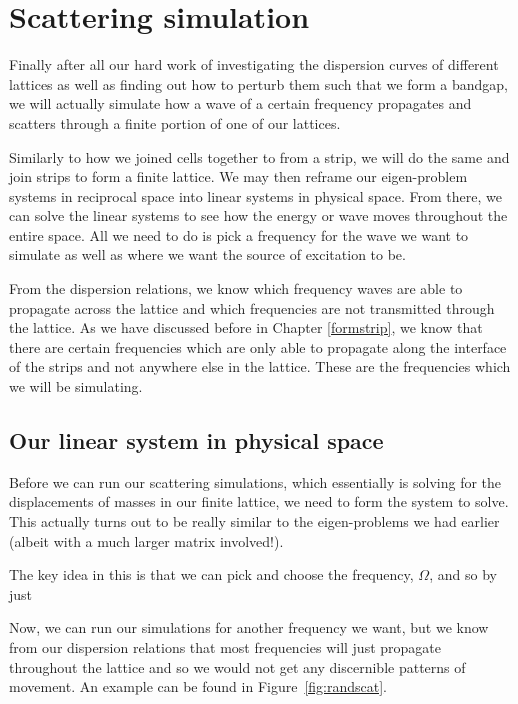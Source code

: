 \chapter{Scattering simulation}
\label{scattering}
Finally after all our hard work of investigating the dispersion curves of
different lattices as well as finding out how to perturb them such that we form
a bandgap, we will actually simulate how a wave of a certain frequency
propagates and scatters through a finite portion of one of our lattices.

Similarly to how we joined cells together to from a strip, we will do the same
and join strips to form a finite lattice. We may then reframe our eigen-problem
systems in reciprocal space into linear systems in physical space. From there,
we can solve the linear systems to see how the energy or wave moves throughout
the entire space. All we need to do is pick a frequency for the wave we want to
simulate as well as where we want the source of excitation to be.

From the dispersion relations, we know which frequency waves are able to
propagate across the lattice and which frequencies are not transmitted through
the lattice. As we have discussed before in Chapter \ref{formstrip}, we know
that there are certain frequencies which are only able to propagate along the
interface of the strips and not anywhere else in the lattice. These are the
frequencies which we will be simulating.

\section{Our linear system in physical space}
Before we can run our scattering simulations, which essentially is solving for
the displacements of masses in our finite lattice, we need to form the system
to solve. This actually turns out to be really similar to the eigen-problems we
had earlier (albeit with a much larger matrix involved!).

The key idea in this is that we can pick and choose the frequency, $\Omega$,
and so by just

Now, we can run our simulations for another frequency we want, but we know from our
dispersion relations that most frequencies will just propagate throughout the
lattice and so we would not get any discernible patterns of movement. An
example can be found in Figure~\ref{fig:randscat}.


